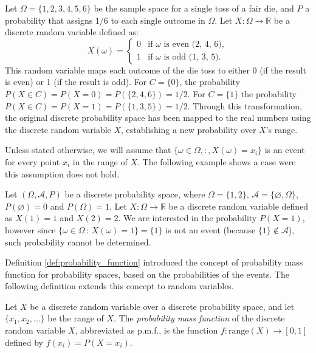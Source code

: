 \begin{example}
\label{ex:probability_distribution_real_line}
Let $\Omega = \{1, 2, 3, 4, 5, 6\}$ be the sample space for a single toss of a fair die, and $P$ a probability that assigns $1/6$ to each single outcome in $\Omega$. Let $X: \Omega \rightarrow \mathbb{R}$ be a discrete random variable defined as:
\[
X(\omega) = 
\begin{cases} 
    0 & \text{if } \omega \text{ is even (2, 4, 6)}, \\
    1 & \text{if } \omega \text{ is odd (1, 3, 5)}.
\end{cases}
\]
This random variable maps each outcome of the die toss to either 0 (if the result is even) or 1 (if the result is odd). For $C = \{0\}$, the probability $P(X \in C) = P(X = 0) = P(\{2, 4, 6\}) = 1/2$. For $C = \{1\}$ the probability $P(X \in C) = P(X = 1) = P(\{1, 3, 5\}) = 1/2$. Through this transformation, the original discrete probability space has been mapped to the real numbers using the discrete random variable $X$, establishing a new probability over $X$'s range.
\end{example}

Unless stated otherwise, we will assume that $\{\omega \in \Omega ,:, X(\omega) = x_i\}$ is an event for every point $x_i$ in the range of $X$. The following example shows a case were this assumption does not hold.

\begin{example}
Let $\left( \Omega, \mathcal{A} , P \right)$ be a discrete probability space, where $\Omega = \{1, 2\}$, $\mathcal{A} = \{\varnothing, \Omega\}$, $P(\varnothing)=0$ and $P(\Omega)=1$. Let $X : \Omega \rightarrow \mathbb{R}$ be a discrete random variable defined as $X(1) = 1$ and $X(2) = 2$. We are interested in the probability $P(X=1)$, however since $\{ \omega \in \Omega \,:\, X \left( \omega \right) = 1 \} = \{1\}$ is not an event (because $\{1\} \notin \mathcal{A}$), such probability cannot be determined.
\end{example}

Definition \ref{def:probability_function} introduced the concept of probability mass function for probability spaces, based on the probabilities of the events. The following definition extends this concept to random variables.

\begin{definition}
Let $X$ be a discrete random variable over a discrete probability space, and let $\{ x_1, x_2, \ldots \}$ be the range of $X$. The \emph{probability mass function} of the discrete random variable $X$, abbreviated as p.m.f., is the function $f : \mathrm{range}(X) \rightarrow [0, 1]$ defined by $f \left( x_i \right) = P \left( X = x_i \right)$.
\end{definition}

